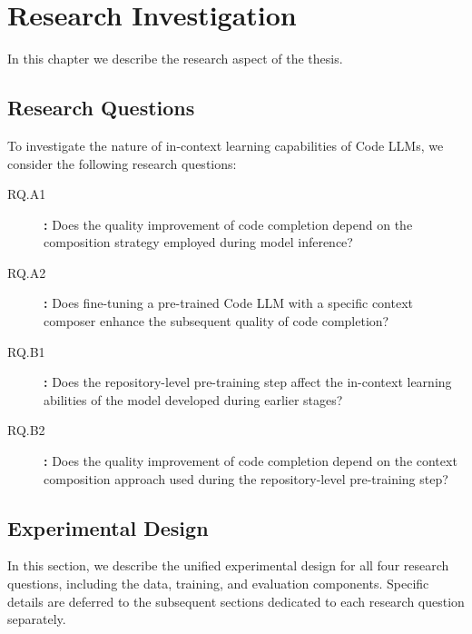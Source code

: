 \chapter{Research Investigation}\label{chap:research-investigation}  %

In this chapter we describe the research aspect of the thesis.  %

\section{Research Questions}

To investigate the nature of in-context learning capabilities of Code LLMs, we consider the following research questions:

\begin{sloppypar}
\begin{description}
    \item[RQ.A1]\label{rq:rq-a1} \textbf{:} Does the quality improvement of code completion depend on the composition strategy employed during model inference?
    \item[RQ.A2]\label{rq:rq-a2} \textbf{:} Does fine-tuning a pre-trained Code LLM with a specific context composer enhance the subsequent quality of code completion?
    \item[RQ.B1]\label{rq:rq-b1} \textbf{:} Does the repository-level pre-training step affect the in-context learning abilities of the model developed during earlier stages?
    \item[RQ.B2]\label{rq:rq-b2} \textbf{:} Does the quality improvement of code completion depend on the context composition approach used during the repository-level pre-training step?
\end{description}
\end{sloppypar}

\section{Experimental Design}

In this section, we describe the unified experimental design for all four research questions, including the data, training, and evaluation components. Specific details are deferred to the subsequent sections dedicated to each research question separately.

